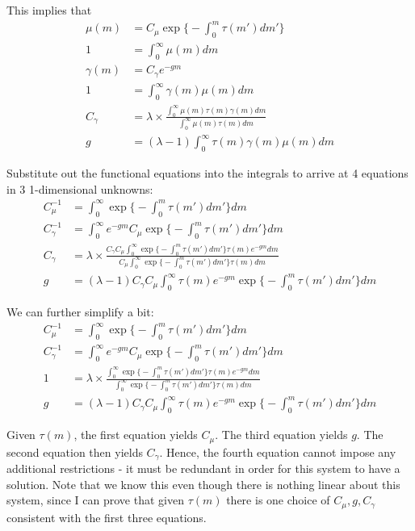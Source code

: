 \documentclass[12pt,english]{article}
\theoremstyle{remark}
\begin{document}
This implies that
\begin{align*}
	\mu(m) &= C_{\mu} \exp \Big\{  -\int_{0}^{m} \tau(m') dm'\Big\} \\
	1 &= \int_{0}^{\infty} \mu(m) dm \\
	\gamma(m) &= C_{\gamma} e^{-gm} \\
	1 &= \int_{0}^{\infty}\gamma(m) \mu(m) dm \\ 
	C_{\gamma} &= \lambda \times \frac{\int_{0}^{\infty} \mu(m) \tau(m) \gamma(m) dm}{\int_{0}^{\infty} \mu(m) \tau(m)dm} \\
	g &= (\lambda -1) \int_{0}^{\infty} \tau(m) \gamma(m) \mu(m) dm
\end{align*}

Substitute out the functional equations into the integrals to arrive at 4 equations in 3 1-dimensional unknowns:
\begin{align*}
	C_{\mu}^{-1} &= \int_{0}^{\infty} \exp \Big\{ -\int_0^m \tau(m') dm'\Big\} dm \\
	C_{\gamma}^{-1} &= \int_{0}^{\infty} e^{-gm}  C_{\mu} \exp \Big\{ - \int_0^m \tau(m') dm'\Big\} dm \\
	C_{\gamma} &= \lambda \times  \frac{ C_{\gamma} C_{\mu} \int_{0}^{\infty} \exp \Big\{  -\int_{0}^{m} \tau(m') dm'\Big\}  \tau(m) e^{-gm} dm}{C_{\mu} \int_{0}^{\infty} \exp \Big\{  -\int_{0}^{m} \tau(m') dm'\Big\}  \tau(m) dm} \\
	g &= (\lambda -1) C_{\gamma} C_{\mu} \int_{0}^{\infty} \tau(m) e^{-gm} \exp \Big\{  -\int_{0}^{m} \tau(m') dm'\Big\}   dm
\end{align*}

We can further simplify a bit: 
\begin{align*}
C_{\mu}^{-1} &= \int_{0}^{\infty} \exp \Big\{- \int_0^m \tau(m') dm'\Big\} dm \\
C_{\gamma}^{-1} &= \int_{0}^{\infty} e^{-gm}  C_{\mu} \exp \Big\{-\int_0^m \tau(m') dm'\Big\} dm \\
1 &= \lambda \times  \frac{ \int_{0}^{\infty} \exp \Big\{  -\int_{0}^{m} \tau(m') dm'\Big\}  \tau(m) e^{-gm} dm}{\int_{0}^{\infty} \exp \Big\{  -\int_{0}^{m} \tau(m') dm'\Big\}  \tau(m) dm} \\
g &= (\lambda -1) C_{\gamma} C_{\mu} \int_{0}^{\infty} \tau(m) e^{-gm} \exp \Big\{  -\int_{0}^{m} \tau(m') dm'\Big\}   dm
\end{align*}

Given $\tau(m)$, the first equation yields $C_{\mu}$. The third equation yields $g$. The second equation then yields $C_{\gamma}$. Hence, the fourth equation cannot impose any additional restrictions - it must be redundant in order for this system to have a solution. Note that we know this even though there is nothing linear about this system, since I can prove that given $\tau(m)$ there is one choice of $C_{\mu}, g, C_{\gamma}$ consistent with the first three equations. 
\end{document}

